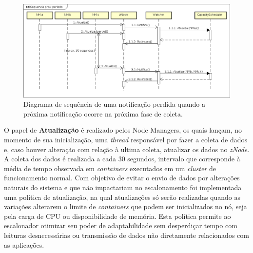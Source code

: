 \begin{figure}[!hbt]
   \centering
   \includegraphics[width=\textwidth]{figuras/seq-prox-per.png}
   \caption{Diagrama de sequência de uma notificação perdida quando a próxima notificação ocorre na próxima fase de coleta.}
   \label{fig:proximo}
\end{figure}

	
O papel de \textbf{Atualização} é realizado pelos Node Managers, os quais lançam, no momento de sua inicialização, uma \textit{thread} responsável por fazer a coleta de dados e, caso houver alteração com relação à ultima coleta, atualizar os dados no \textit{zNode}. A coleta dos dados é realizada a cada 30 segundos, intervalo que corresponde à média de tempo observada em \textit{containers} executados em um \textit{cluster} de funcionamento normal. Com objetivo de evitar o envio de dados por alterações naturais do sistema e que não impactariam no escalonamento foi implementada uma política de atualização, na qual atualizações só serão realizadas quando as variações alterarem o limite de \textit{containers} que podem ser inicializados no nó, seja pela carga de CPU ou disponibilidade de memória. Esta política permite ao escalonador otimizar seu poder de adaptabilidade sem desperdiçar tempo com leituras desnecessárias ou transmissão de dados não diretamente relacionados com as aplicações.

